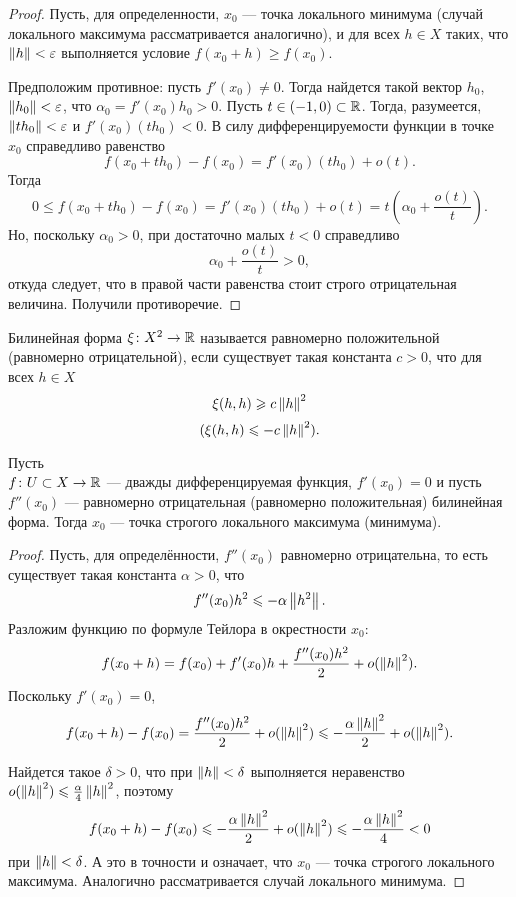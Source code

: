 \begin{proof}
    Пусть, для определенности, $x_0$ --- точка локального минимума (случай локального максимума
    рассматривается аналогично), и для всех $h \in X$ таких, что $\left\|h\right\| < \varepsilon$ 
    выполняется условие $f(x_0 + h) \geq f(x_0)$.

    Предположим противное: пусть $f'(x_0) \neq 0$. Тогда найдется такой вектор $h_0$, 
    $\left\|h_0\right\| < \varepsilon$, что $\alpha_0 = f'(x_0)h_0 > 0$. Пусть 
    $t \in (-1, 0) \subset \mathbb{R}$.
    Тогда, разумеется, $\left\|t h_0\right\| < \varepsilon$ и $f'(x_0)(th_0) < 0$.
    В силу дифференцируемости функции в точке $x_0$ справедливо равенство
    \[ f(x_0 + t h_0) - f(x_0) = f'(x_0)(th_0) + o(t). \]
    Тогда
    \[ 0 \leq f(x_0 + t h_0) - f(x_0) = f'(x_0)(t h_0) + o(t) = t \left( \alpha_0 +
         \frac{o(t)}{t} \right). \]
    Но, поскольку $\alpha_0 > 0$, при достаточно малых $t < 0$ справедливо
    \[ \alpha_0 + \frac{o(t)}{t} > 0, \]
    откуда следует, что в правой части равенства стоит строго отрицательная величина. 
    Получили противоречие.
\end{proof}

\begin{definition}
    Билинейная форма $\xi \colon X^2 \to \mathbb{R}$ называется равномерно положительной (равномерно
    отрицательной), если существует такая константа $c > 0$, что для всех $h \in X$
    \[ \xi(h, h) \geqslant c \left\|h\right\|^2 \]
    \[ (\xi(h, h) \leqslant -c \left\|h\right\|^2). \]
\end{definition}

\begin{theorem}
    Пусть \\ $f \colon U \subset X \to \mathbb{R}$ --- дважды дифференцируемая функция, $f'(x_0) = 0$
    и пусть $f''(x_0)$ --- равномерно отрицательная (равномерно положительная) билинейная форма.
    Тогда $x_0$ --- точка строгого локального максимума (минимума).
\end{theorem}

\begin{proof}
    Пусть, для определённости, $f''(x_0)$ равномерно отрицательна, 
    то есть существует такая константа $\alpha > 0$, что
    \[ f''(x_0)h^2 \leqslant -\alpha\left\|h^2\right\|. \]
    Разложим функцию по формуле Тейлора в окрестности $x_0$:
    \[ f(x_0+h) = f(x_0) + f'(x_0)h + \frac{f''(x_0)h^2}{2} + o(\left\|h\right\|^2). \]
    Поскольку $f'(x_0) = 0$,
    \[ f(x_0+h) - f(x_0) = \frac{f''(x_0)h^2}{2} + o(\left\|h\right\|^2) \leqslant 
        -\frac{\alpha \left\|h\right\|^2}{2} + o(\left\|h\right\|^2). \]

    Найдется такое $\delta > 0$, что при $\left\|h\right\| < \delta$ выполняется 
    неравенство $o(\left\|h\right\|^2) \leqslant \frac{\alpha}{4}\left\|h\right\|^2$, поэтому
    \[ f(x_0+h) - f(x_0) \leqslant -\frac{\alpha \left\|h\right\|^2}{2} + o(\left\|h\right\|^2) \leqslant 
        -\frac{\alpha \left\|h\right\|^2}{4} < 0 \]
    при $\left\|h\right\| < \delta$. А это в точности и означает, что $x_0$ --- точка строгого 
    локального максимума. Аналогично рассматривается случай локального минимума.
\end{proof}
